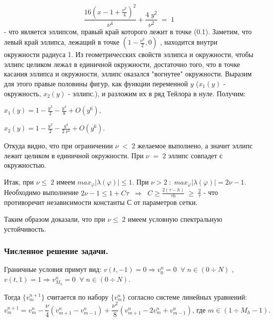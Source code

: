 \documentclass[a4paper,12pt]{article}
\begin{document}
\[
    \frac{16(x-1+\frac{\nu^2}{4})^2}{\nu^4}+\frac{4 \; y^2}{\nu^2} \;=\;1
\] - что является эллипсом, правый край которого лежит в точке (0.1). Заметим, что левый край эллипса, лежащий в точке $(1-\frac{\nu^2}{2},0)$ , находится внутри окружности радиуса 1. Из геометричесских свойств эллипса и окружности, чтобы эллипс целиком лежал в единичной окружности, достаточно того, что в точке касания эллипса и окружности, эллипс оказался "вогнутее" окружности. Выразим для этого правые половины фигур, как функции переменной $y$ ($x_1(y)$ - окружность, $x_2(y)$ - эллипс.),  и разложим их в ряд Тейлора в нуле. Получим: 

$
x_1(y)=1-\frac{y^2}{2}-\frac{y^4}{8}+O(y^6) ,
$

$
x_2(y)=1-\frac{y^2}{2}-\frac{y^4}{2\; \nu^2}+O(y^6).
$ 

Откуда видно, что при ограничении $\nu\;<\;2$ желаемое выполнено, а значит эллипс лежит целиком в единичной окружности. При $\nu\;=\;2$ эллипс совпадет с окружностью.

Итак, при $\nu\leqslant\;2$ имеем $max_{\varphi}|\lambda(\varphi)|\leqslant 1$. При $\nu>2\;:\;max_{\varphi}|\lambda(\varphi)|=2 \nu -1$. Необходимо выполнение $2 \nu -1 \leqslant 1 + C \tau \;\;\Rightarrow\;\; C \geqslant \frac{2(\tau-h)}{\tau h}\;\geqslant\;\frac{2}{\tau}$ - что противоречит независимости константы С от параметров сетки. 

Таким образом доказали, что при $\nu\leqslant\;2$ имеем условную спектральную устойчивость.

\subsubsection{Численное решение задачи.}
Граничные условия примут вид: $v(t,-1)=0 \Rightarrow v^n_0=0 \;\; \forall\; n \in (0 \div N)$ , $v(t,1)=1 \Rightarrow v^n_{M_h}=0 \;\; \forall\; n \in (0 \div N)$.

Тогда  $\{v^{n+1}_m\}$ считается по набору $\{v^{n}_m\}$ согласно системе линейных уравнений:
\[
    v^{n+1}_m=v^n_m-\frac{\nu}{4}(v^n_{m+1}-v^n_{m-1})+\frac{{\nu}^2}{8} ( v^n_{m+1}-2 v^n_m + v^n_{m-1})\text{,  где $m \in (1 \div M_h-1)$.}
\]
\end{document}
